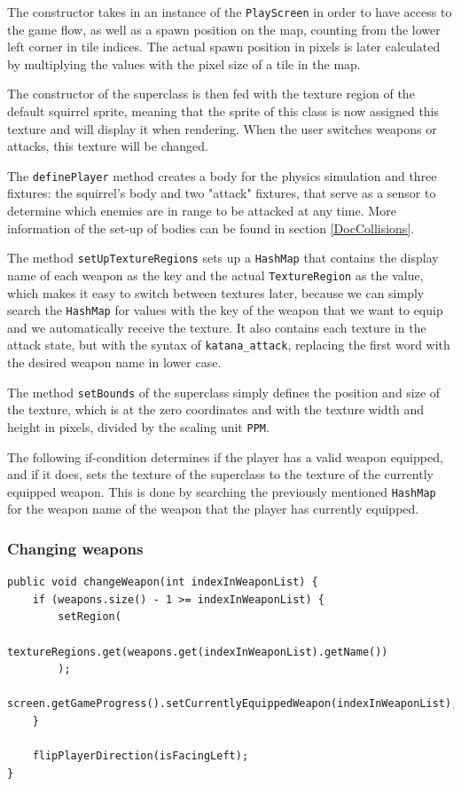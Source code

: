 \documentclass[12p]{article}
\begin{document}
The constructor takes in an instance of the \texttt{PlayScreen} in order to have access to the game flow, as well as a spawn position on the map, counting from the lower left corner in tile indices. The actual spawn position in pixels is later calculated by multiplying the values with the pixel size of a tile in the map.

The constructor of the superclass is then fed with the texture region of the default squirrel sprite, meaning that the sprite of this class is now assigned this texture and will display it when rendering. When the user switches weapons or attacks, this texture will be changed. 

The \texttt{definePlayer} method creates a body for the physics simulation and three fixtures: the squirrel's body and two "attack" fixtures, that serve as a sensor to determine which enemies are in range to be attacked at any time. More information of the set-up of bodies can be found in section \ref{DocCollisions}.

The method \texttt{setUpTextureRegions} sets up a \texttt{HashMap} that contains the display name of each weapon as the key and the actual \texttt{TextureRegion} as the value, which makes it easy to switch between textures later, because we can simply search the \texttt{HashMap} for values with the key of the weapon that we want to equip and we automatically receive the texture. It also contains each texture in the attack state, but with the syntax of \texttt{katana\_attack}, replacing the first word with the desired weapon name in lower case.

The method \texttt{setBounds} of the superclass simply defines the position and size of the texture, which is at the zero coordinates and with the texture width and height in pixels, divided by the scaling unit \texttt{PPM}.

The following if-condition determines if the player has a valid weapon equipped, and if it does, sets the texture of the superclass to the texture of the currently equipped weapon. This is done by searching the previously mentioned \texttt{HashMap} for the weapon name of the weapon that the player has currently equipped.

\subsubsection{Changing weapons}

\begin{verbatim}
public void changeWeapon(int indexInWeaponList) {
    if (weapons.size() - 1 >= indexInWeaponList) {
        setRegion(
            textureRegions.get(weapons.get(indexInWeaponList).getName())
        );
        screen.getGameProgress().setCurrentlyEquippedWeapon(indexInWeaponList);
    }

    flipPlayerDirection(isFacingLeft);
}
\end{verbatim}
\end{document}
